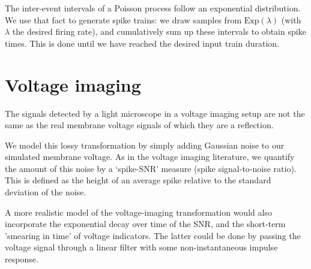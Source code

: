 The inter-event intervals of a Poisson process follow an exponential distribution.
We use that fact to generate spike trains: we draw samples from $\mathrm{Exp}(\lambda)$ (with $\lambda$ the desired firing rate), and cumulatively sum up these intervals  to obtain spike times. This is done until we have reached the desired input train duration.


\section{Voltage imaging}

The signals detected by a light microscope in a voltage imaging setup are not the same as the real membrane voltage signals of which they are a reflection.

We model this lossy transformation by simply adding Gaussian noise to our simulated membrane voltage. As in the voltage imaging literature, we quantify the amount of this  noise by a `spike-SNR' measure (spike signal-to-noise ratio). This is defined as the height of an average spike relative to the standard deviation of the noise.

A more realistic model of the voltage-imaging transformation would also incorporate the exponential decay over time of the SNR, and the short-term 'smearing in time' of voltage indicators. The latter could be done by passing the voltage signal through a linear filter with some non-instantaneous impulse response.
